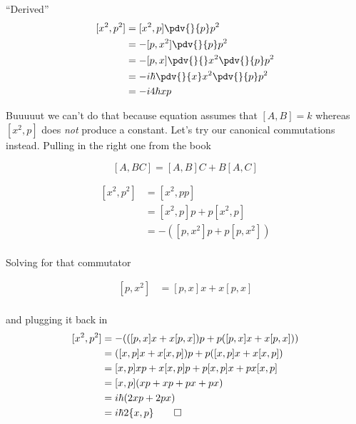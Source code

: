 \begin{answer}
\begin{answerpart}{``Derived''}
    \begin{equation}
      \begin{alignedat}{2}
        && [x^2,p^2]
        &= [x^2,p]\pdv{}{p}p^2
        \\
        &&&= -[p,x^2]\pdv{}{p}p^2\\
        &&&= -[p,x]\pdv{}{}x^2\pdv{}{p}p^2\\
        &&&= -i\hbar\pdv{}{x}x^2\pdv{}{p}p^2\\
        &&&= -i4\hbar x p\\
      \end{alignedat}
    \end{equation}

    Buuuuut we can't do that because equation 
    assumes that $[A,B] = k$ whereas $[x^2, p]$ does \emph{not}
    produce a constant.  Let's try our canonical commutations instead.
    Pulling in the right one from the book

    \begin{equation}
      \tag{1.232e}
      [A,BC] = [A,B]C + B[A,C]
    \end{equation}

    \begin{equation}
      \begin{split}
        [x^2,p^2]
        &= [x^2, pp]\\
        &= [x^2,p]p + p[x^2,p]\\
        &= -([p,x^2]p + p[p,x^2])\\
      \end{split}
    \end{equation}

    Solving for that commutator

    \begin{equation}
      \begin{split}
        [p,x^2] &= [p,x]x + x[p,x]\\
      \end{split}
    \end{equation}

    and plugging it back in
    \begin{equation}
      \begin{split}
        [x^2,p^2]
        &= -(([p,x]x + x[p,x])p + p([p,x]x + x[p,x]))\\
        &= ([x,p]x + x[x,p])p + p([x,p]x + x[x,p])\\
        &= [x,p]xp + x[x,p]p + p[x,p]x + px[x,p]\\
        &= [x,p](xp + xp + px + px)\\
        &= i\hbar(2xp + 2px)\\
        &= i\hbar2\{x,p\}\qed\\
      \end{split}
    \end{equation}


\end{answerpart}
\end{answer}
